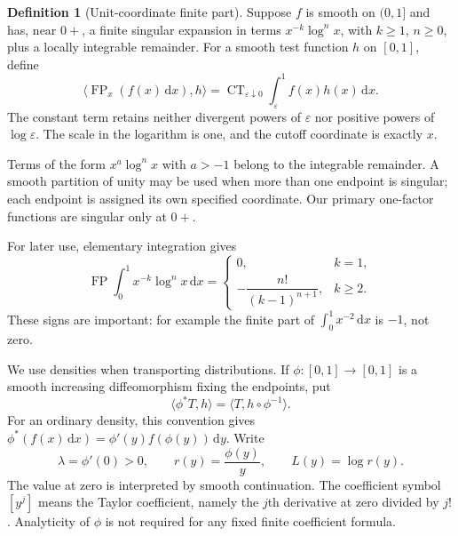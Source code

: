 \documentclass[11pt]{article}
\theoremstyle{definition}\newtheorem{definition}[theorem]{Definition}
\theoremstyle{remark}\newtheorem{remark}[theorem]{Remark}
\DeclareMathOperator{\FP}{FP}
\DeclareMathOperator{\CT}{CT}
\newcommand{\dd}{\,\mathrm d}
\newcommand{\eps}{\varepsilon}
\begin{document}
\begin{definition}[Unit-coordinate finite part]\label{def:FP}
Suppose $f$ is smooth on $(0,1]$ and has, near $0+$, a finite singular expansion in terms $x^{-k}\log^n x$, with $k\ge1$, $n\ge0$, plus a locally integrable remainder. For a smooth test function $h$ on $[0,1]$, define
\begin{equation}\label{eq:FP-definition}
\langle\FP_x(f(x)\dd x),h\rangle
=\CT_{\eps\downarrow0}\int_\eps^1 f(x)h(x)\dd x.
\end{equation}
The constant term retains neither divergent powers of $\eps$ nor positive powers of $\log\eps$. The scale in the logarithm is one, and the cutoff coordinate is exactly $x$.
\end{definition}
Terms of the form $x^a\log^n x$ with $a>-1$ belong to the integrable remainder. A smooth partition of unity may be used when more than one endpoint is singular; each endpoint is assigned its own specified coordinate. Our primary one-factor functions are singular only at $0+$.

For later use, elementary integration gives
\begin{equation}\label{eq:monomial-FP}
\FP\int_0^1 x^{-k}\log^n x\dd x=
\begin{cases}
0,&k=1,\\[2pt]
-\dfrac{n!}{(k-1)^{n+1}},&k\ge2.
\end{cases}
\end{equation}
These signs are important: for example the finite part of $\int_0^1x^{-2}\dd x$ is $-1$, not zero.

We use densities when transporting distributions. If $\phi:[0,1]\to[0,1]$ is a smooth increasing diffeomorphism fixing the endpoints, put
\begin{equation}\label{eq:density-pullback}
\langle\phi^*T,h\rangle=\langle T,h\circ\phi^{-1}\rangle.
\end{equation}
For an ordinary density, this convention gives
$\phi^*(f(x)\dd x)=\phi'(y)f(\phi(y))\dd y$.
Write
\begin{equation}\label{eq:rL}
\lambda=\phi'(0)>0,\qquad r(y)=\frac{\phi(y)}y,\qquad L(y)=\log r(y).
\end{equation}
The value at zero is interpreted by smooth continuation. The coefficient symbol $[y^j]$ means the Taylor coefficient, namely the $j$th derivative at zero divided by $j!$. Analyticity of $\phi$ is not required for any fixed finite coefficient formula.
\end{document}
